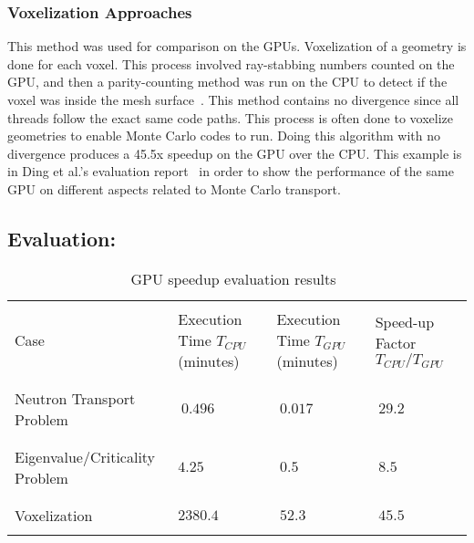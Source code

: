 \subsubsection*{\textbf{Voxelization Approaches}}

This method was used for comparison on the GPUs.
%
Voxelization of a geometry is done for each voxel.
This process involved ray-stabbing numbers counted on the GPU, and then a parity-counting method was run on the CPU to detect if the voxel was inside the mesh surface~\cite{na2010deformable}.
%
This method contains no divergence since all threads follow the exact same code paths.
%
This process is often done to voxelize geometries to enable Monte Carlo codes to run.
%
Doing this algorithm with no divergence produces a 45.5x speedup on the GPU over the CPU.
%
This example is in Ding et al.'s evaluation report~\cite{ding2011evaluation} in order to show the performance of the same GPU on different aspects related to Monte Carlo transport.

\subsection*{ \textbf{Evaluation:}}

\begin{table}
\caption { GPU speedup evaluation results~\cite{ding2011evaluation} } \label{tab:GPUPerfEval} 
\begin{center}
\begin{tabular}{ |C{.10\textwidth}|C{.10\textwidth}|C{.10\textwidth}|C{.10\textwidth}|}
\hline
 & & & \\
Case & Execution Time $T_{CPU}$ (minutes) & Execution Time $T_{GPU}$ (minutes) & Speed-up Factor $T_{CPU}/T_{GPU}$ \\
 & & & \\
 \hline
 & & & \\
Neutron Transport Problem & $~ 0.496$ & $ ~0.017$ & $~ 29.2$ \\ 
 & & & \\
\hline
 & & & \\
Eigenvalue/Criticality Problem & $ 4.25 $ & $ ~ 0.5 $ & $ ~ 8.5 $ \\
 & & & \\
\hline
 & & & \\
Voxelization & $ 2380.4 $ & $ ~ 52.3 $ & $~ 45.5 $ \\
 & & & \\
\hline
\end{tabular}
\end{center}
\end{table}

